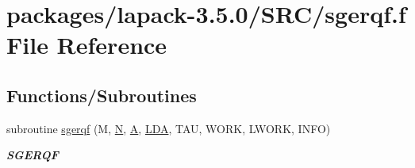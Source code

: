\hypertarget{sgerqf_8f}{}\section{packages/lapack-\/3.5.0/\+S\+R\+C/sgerqf.f File Reference}
\label{sgerqf_8f}
\subsection*{Functions/\+Subroutines}
\begin{DoxyCompactItemize}
\item 
subroutine \hyperlink{group__realGEcomputational_ga6cf9836380912f68d520a17c77832d65}{sgerqf} (M, \hyperlink{polmisc_8c_a0240ac851181b84ac374872dc5434ee4}{N}, \hyperlink{classA}{A}, \hyperlink{example__user_8c_ae946da542ce0db94dced19b2ecefd1aa}{L\+D\+A}, T\+A\+U, W\+O\+R\+K, L\+W\+O\+R\+K, I\+N\+F\+O)
\begin{DoxyCompactList}\small\item\em {\bfseries S\+G\+E\+R\+Q\+F} \end{DoxyCompactList}\end{DoxyCompactItemize}
